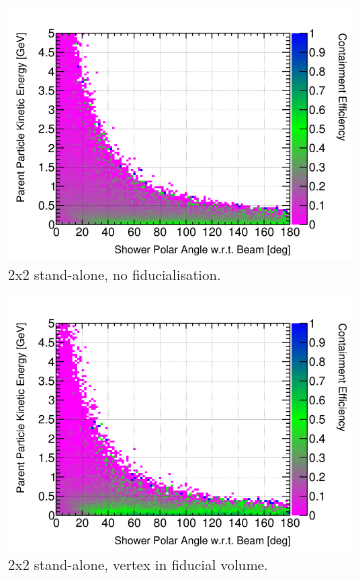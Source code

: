 \documentclass[10pt,a4paper,openany]{article}
\begin{document}
\begin{figure}[htbp]
	\centering
	\begin{subfigure}[b]{0.49\textwidth}
		\centering
		\includegraphics[width=1.0\textwidth]{EM_cont_eff_2x2.png}
		\caption{2x2 stand-alone, no fiducialisation.}
		\label{}
	\end{subfigure}	
	\hfill
	\begin{subfigure}[b]{0.49\textwidth}
		\centering
    \includegraphics[width=1.0\textwidth]{EM_cont_eff_2x2_fiducial.png}
		\caption{2x2 stand-alone, vertex in fiducial volume.}
		\label{}
	\end{subfigure}	
	\begin{subfigure}[b]{0.49\textwidth}
		\centering

\end{subfigure}
\end{figure}
\end{document}
